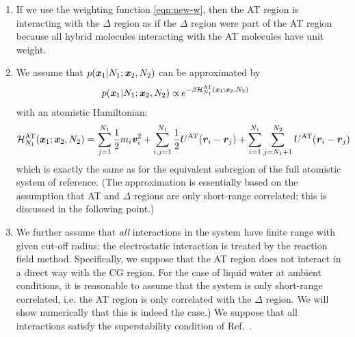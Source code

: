 \documentclass[aip,jcp,a4paper,reprint,onecolumn]{revtex4-1}
\newcommand{\vect}[1]{\textbf{\textit{#1}}}
\newcommand{\AT}{{\textrm{{AT}}}}
\newcommand{\HY}{{\Delta}}
\begin{document}
\begin{enumerate}

\item If we use the weighting function \eqref{eqn:new-w},
then the AT region is interacting with the $\HY$ region
as if the $\HY$ region were part of the AT region because
all hybrid molecules interacting with the AT molecules have unit weight.

\item We assume that $p(\vect x_1 | N_1; \vect x_2, N_2)$  can be approximated by
\begin{align}\label{eqn:p-1-1}
  p(\vect x_1 | N_1; \vect x_2, N_2)
  \propto &\,
  e^{-\beta\mathcal H_{N_1}^{\AT}(\vect x_1; \vect x_2, N_2)}
\end{align}
with an atomistic Hamiltonian:
\begin{align}\label{eqn:p-1-2}
  \mathcal H_{N_1}^{{\AT}}(\vect x_1; \vect x_2, N_2) = &\,
  \sum_{j=1}^{N_1}\frac12 m_i\vect v_i^2 + 
  \sum_{i,j=1}^{N_1}\frac12 U^{{\AT}}(\vect r_i - \vect r_j)  +
  \sum_{i=1}^{N_1}\sum_{j=N_1+1}^{N_2} U^{{\AT}}(\vect r_i - \vect r_j)   
\end{align}
which is exactly the same as for the equivalent subregion of the full atomistic system of reference. (The approximation is essentially based on the assumption that AT and $\Delta$ regions are only short-range correlated; this is discussed in the following point.)

\item We further assume that \emph{all} interactions in the system have finite range with given cut-off radius; the
  electrostatic interaction is treated by the reaction field method. Specifically, we suppose that 
  the AT region does not interact in a direct way with the CG region.
  For the case of liquid water at ambient conditions, it is reasonable to assume that the system is only short-range correlated, i.e. the AT region is only correlated with the $\HY$ region. We will show numerically that this is indeed the case.)
  We suppose that all interactions satisfy the superstability condition of Ref.~.
  


\end{enumerate}
\end{document}
